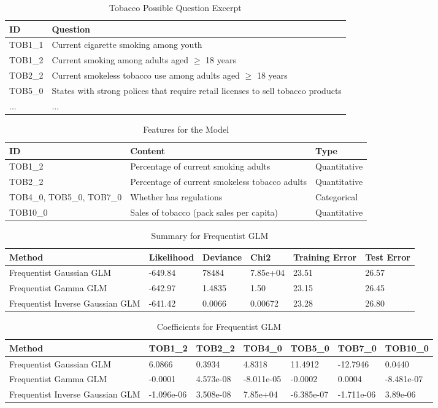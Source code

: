 \documentclass{article}
\begin{document}
\begin{table}[h]
\caption{\label{tab:questionIdTable2}Tobacco Possible Question Excerpt}
\centering
\begin{tabular}{m|m}
ID & Question \\\hline
TOB1\_1 & Current cigarette smoking among youth \\
TOB1\_2 & Current smoking among adults aged $\geq$ 18 years \\
TOB2\_2 & Current smokeless tobacco use among adults aged $\geq$ 18 years \\
TOB5\_0 & States with strong polices that require retail licenses to sell tobacco products \\
... & ...
\end{tabular}
\end{table}

\begin{table}[h]
\caption{\label{tab:featurechosen}Features for the Model}
\centering
\begin{tabular}{m|m|m}
ID & Content & Type \\\hline
TOB1\_2 & Percentage of current smoking adults & Quantitative\\
TOB2\_2 & Percentage of current smokeless tobacco adults & Quantitative\\
TOB4\_0, TOB5\_0, TOB7\_0 & Whether has regulations & Categorical\\ 
TOB10\_0 & Sales of tobacco (pack sales per capita) & Quantitative
\end{tabular}
\end{table}

\begin{table}[h]
\caption{\label{tab:freqglmsummary}Summary for Frequentist GLM}
\centering
\begin{tabular}{m|m|m|m|m|m}
Method & Likelihood & Deviance & Chi2 & Training Error & Test Error \\\hline
Frequentist Gaussian GLM & -649.84 & 78484 & 7.85e+04 & 23.51 & 26.57\\
Frequentist Gamma GLM & -642.97 & 1.4835 & 1.50 & 23.15 & 26.45\\
Frequentist Inverse Gaussian GLM & -641.42 & 0.0066 & 0.00672 & 23.28 & 26.80\\ 
\end{tabular}
\end{table}

\begin{table}[h]
\caption{\label{tab:freqglmcoeff}Coefficients for Frequentist GLM}
\centering
\begin{tabular}{m|m|m|m|m|m|m}
Method & TOB1\_2 & TOB2\_2 & TOB4\_0 & TOB5\_0 & TOB7\_0 & TOB10\_0 \\\hline
Frequentist Gaussian GLM & 6.0866 & 0.3934 & 4.8318 & 11.4912 & -12.7946 & 0.0440 \\
Frequentist Gamma GLM & -0.0001 & 4.573e-08 & -8.011e-05 & -0.0002 & 0.0004 & -8.481e-07 \\
Frequentist Inverse Gaussian GLM & -1.096e-06  & 3.508e-08 & 7.85e+04 & -6.385e-07 & -1.711e-06 & 3.89e-06 \\ 
\end{tabular}
\end{table}
\end{document}
